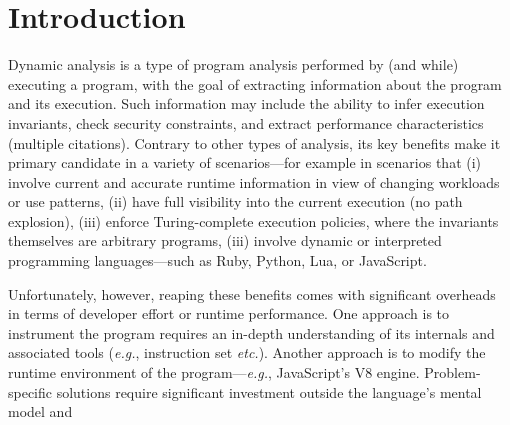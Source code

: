 \documentclass[letterpaper,twocolumn,10pt]{article}
\def\eg{{\em e.g.}, }
\def\etc{{\em etc.}\xspace}
\begin{document}
\begin{abstract}

\end{abstract}

\section{Introduction}
\label{intro}

Dynamic analysis is a type of program analysis performed by (and while) executing a program, with the goal of extracting information about the program and its execution.
Such information may include the ability to infer execution invariants, check security constraints, and extract performance characteristics (multiple citations).
Contrary to other types of analysis, its key benefits make it primary candidate in a variety of scenarios---for example in scenarios that
  (i) involve current and accurate runtime information in view of changing workloads or use patterns,
  (ii) have full visibility into the current execution (no path explosion),
  (iii) enforce Turing-complete execution policies, where the invariants themselves are arbitrary programs,
  (iii) involve dynamic or interpreted programming languages---such as Ruby, Python, Lua, or JavaScript.


Unfortunately, however, reaping these benefits comes with significant overheads in terms of developer effort or runtime performance.
One approach is to instrument the program requires an in-depth understanding of its internals and associated tools (\eg instruction set \etc).
Another approach is to modify the runtime environment of the program---\eg JavaScript's V8 engine.
Problem-specific solutions require significant investment outside the language's mental model and  
\end{document}
